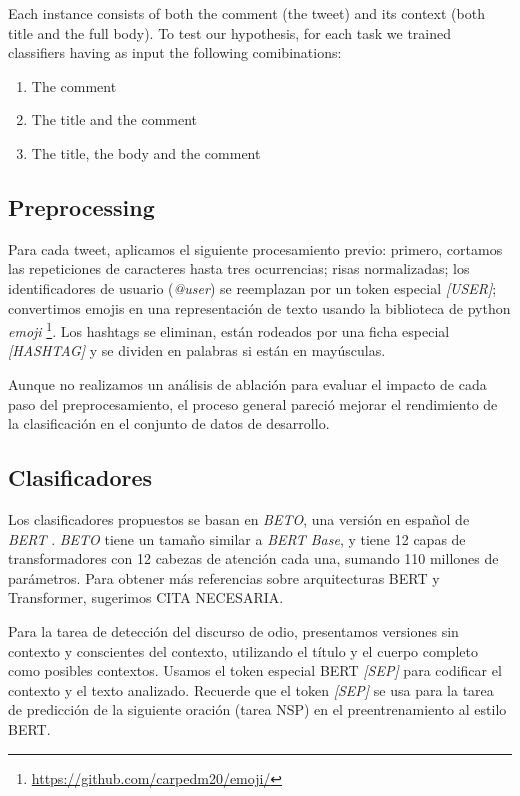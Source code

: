 Each instance consists of both the comment (the tweet) and its context (both title and the full body). To test our hypothesis, for each task we trained classifiers having as input the following comibinations:

\begin{enumerate}
    \item The comment
    \item The title and the comment
    \item The title, the body and the comment
\end{enumerate}


\subsection{Preprocessing}

Para cada tweet, aplicamos el siguiente procesamiento previo: primero, cortamos las repeticiones de caracteres hasta tres ocurrencias; risas normalizadas; los identificadores de usuario (\emph{@user}) se reemplazan por un token especial \emph{[USER]}; convertimos emojis en una representación de texto usando la biblioteca de python \emph{emoji} \footnote {\url{https://github.com/carpedm20/emoji/}}. Los hashtags se eliminan, están rodeados por una ficha especial \emph{[HASHTAG]} y se dividen en palabras si están en mayúsculas.

Aunque no realizamos un análisis de ablación para evaluar el impacto de cada paso del preprocesamiento, el proceso general pareció mejorar el rendimiento de la clasificación en el conjunto de datos de desarrollo.

\subsection{Clasificadores}

Los clasificadores propuestos se basan en \emph{BETO}\cite{canete2020spanish}, una versión en español de \emph{BERT} \cite{devlin2018bert}. \emph{BETO} tiene un tamaño similar a \emph {BERT Base}, y tiene 12 capas de transformadores con 12 cabezas de atención cada una, sumando 110 millones de parámetros. Para obtener más referencias sobre arquitecturas BERT y Transformer, sugerimos CITA NECESARIA.

Para la tarea de detección del discurso de odio, presentamos versiones sin contexto y conscientes del contexto, utilizando el título y el cuerpo completo como posibles contextos. Usamos el token especial BERT \emph {[SEP]} para codificar el contexto y el texto analizado. Recuerde que el token \emph {[SEP]} se usa para la tarea de predicción de la siguiente oración (tarea NSP) en el preentrenamiento al estilo BERT.

